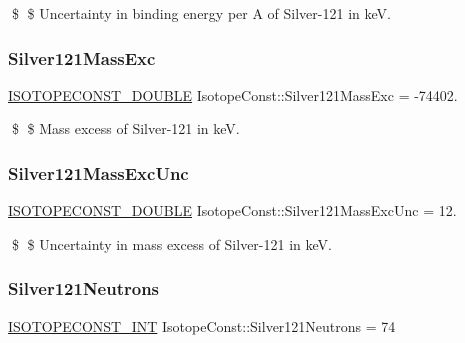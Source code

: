 \$ \$ Uncertainty in binding energy per A of Silver-\/121 in keV. \mbox{\label{group___isotope_const-_silver-_ag121_gac23c043129c5150cb0a5db184b3a0d6a}} 
\subsubsection{\texorpdfstring{Silver121\+Mass\+Exc}{Silver121MassExc}}
{\footnotesize\ttfamily \mbox{\hyperlink{group___isotope_const-_macros_ga8f45a7272ce02c0b4c65c44636ed719a}{I\+S\+O\+T\+O\+P\+E\+C\+O\+N\+S\+T\+\_\+\+D\+O\+U\+B\+LE}} Isotope\+Const\+::\+Silver121\+Mass\+Exc = -\/74402.}

\$ \$ Mass excess of Silver-\/121 in keV. \mbox{\label{group___isotope_const-_silver-_ag121_gae98ac0e2056f61bdfc3cc855b86b06ae}} 
\subsubsection{\texorpdfstring{Silver121\+Mass\+Exc\+Unc}{Silver121MassExcUnc}}
{\footnotesize\ttfamily \mbox{\hyperlink{group___isotope_const-_macros_ga8f45a7272ce02c0b4c65c44636ed719a}{I\+S\+O\+T\+O\+P\+E\+C\+O\+N\+S\+T\+\_\+\+D\+O\+U\+B\+LE}} Isotope\+Const\+::\+Silver121\+Mass\+Exc\+Unc = 12.}

\$ \$ Uncertainty in mass excess of Silver-\/121 in keV. \mbox{\label{group___isotope_const-_silver-_ag121_ga350248ea2b32ef50c62b20ac21ed03a1}} 
\subsubsection{\texorpdfstring{Silver121\+Neutrons}{Silver121Neutrons}}
{\footnotesize\ttfamily \mbox{\hyperlink{group___isotope_const-_macros_ga5f18360b3e99483a35c32d789e62621c}{I\+S\+O\+T\+O\+P\+E\+C\+O\+N\+S\+T\+\_\+\+I\+NT}} Isotope\+Const\+::\+Silver121\+Neutrons = 74}

